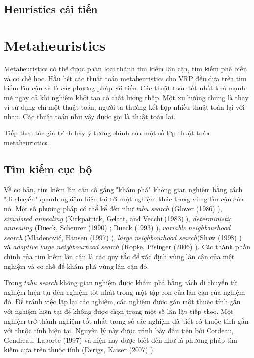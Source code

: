 \subsection{Heuristics cải tiến}

\section{Metaheuristics}

Metaheuristics có thể được phân lọai thành tìm kiếm lân cận, tìm kiếm phổ biến và cơ chế học. Hầu hết các thuật toán metaheuristics cho VRP đều dựa trên tìm kiếm lân cận và là các phương pháp cải tiến. Các thuật toán tốt nhất khá mạnh mẽ ngay cả khi nghiệm khởi tạo có chất lượng thấp. Một xu hướng chung là thay vì sử dụng chỉ một thuật toán, người ta thường kết hợp nhiều thuật toán lại với nhau. Các thuật toán như vậy được gọi là thuật toán lai. 

Tiếp theo tác giả trình bày ý tưởng chính của một số lớp thuật toán metaheurictics. 

\subsection{Tìm kiếm cục bộ}

Về cơ bản, tìm kiếm lân cận cố gắng "khám phá" không gian nghiệm bằng cách "di chuyển" quanh nghiệm hiện tại tới một nghiệm khác trong vùng lần cận của nó. Một số phương pháp có thể kể đến như \textit{tabu search} (Glover (1986) \cite{glover1986future}), \textit{simulated annealing} (Kirkpatrick, Gelatt, and Vecchi
(1983) \cite{kirkpatrick1983optimization}), \textit{deterministic annealing} (Dueck, Scheurer
(1990) \cite{dueck1990threshold}; Dueck (1993) \cite{dueck1993new}), \textit{variable neighbourhood search} (Mladenović, Hansen (1997) \cite{mladenovic1997variable}), \textit{large neighbourhood search}(Shaw (1998) \cite{shaw1998using}) và \textit{adaptive large neighbourhood search} (Ropke, Pisinger (2006) \cite{ropke2006adaptive}). Các thành phần chính của tìm kiếm lân cận là các quy tắc để xác định vùng lân cận của một nghiệm và cơ chế để khám phá vùng lân cận đó. 

Trong \textit{tabu search} không gian nghiệm được khám phá bằng cách di chuyển từ nghiệm hiện tại đến nghiệm tốt nhất trong một tập con của lân cận của nghiệm đó. Để tránh việc lặp lại các nghiệm, các nghiệm được gán một thuộc tính gắn với nghiệm hiện tại để không được chọn trong một số lần lặp tiếp theo. Một nghiệm trở thành nghiệm tốt nhất trong số các nghiệm đã biết có thuộc tính gắn với thuộc tính hiện tại. Nguyên lý này được trình bày đầu tiên bởi Cordeau, Gendreau, Laporte (1997) \cite{cordeau1997tabu} và hiện nay được biết đến như là phương pháp tìm kiếm dựa trên thuộc tính (Derigs, Kaiser (2007) \cite{derigs2007applying}).

